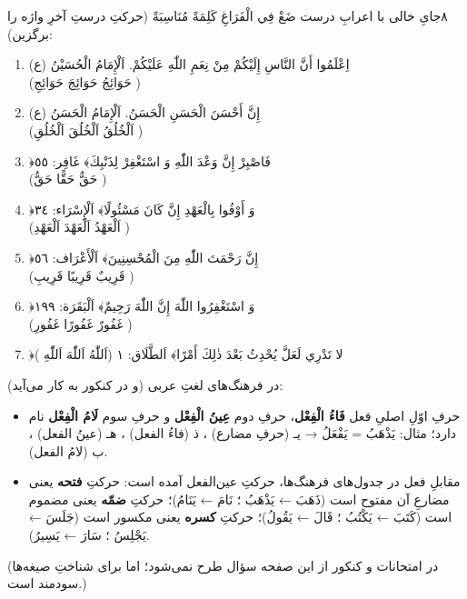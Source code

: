 \begin{JTamrin}{٨}{جایِ خالی با اعرابِ درست}
ضَعْ فِي الْفَرَاغِ كَلِمَةً مُنَاسِبَةً (حرکتِ درستِ آخرِ واژه را برگزین):

\begin{enumerate}
  \item اِعْلَمُوا أَنَّ \JdotsW{2.2cm} النَّاسِ إِلَيْكُمْ مِنْ نِعَمِ اللّٰهِ
        عَلَيْكُمْ. اَلْإِمَامُ الْحُسَيْنُ (ع)\\
        (حَوَائِجُ \JTick\quad حَوَائِجَ \JTick\quad حَوَائِجِ \JTick)
  \item إِنَّ أَحْسَنَ الْحَسَنِ \JdotsW{2.2cm} الْحَسَنُ. اَلْإِمَامُ الْحَسَنُ
        (ع)\\
        (اَلْخُلُقُ \JTick\quad اَلْخُلُقَ \JTick\quad اَلْخُلُقِ \JTick)
  \item ﴿فَاصْبِرْ إِنَّ وَعْدَ اللّٰهِ \JdotsW{2.2cm} وَ اسْتَغْفِرْ
        لِذَنْبِكَ﴾ غَافِر: ٥٥\\
        (حَقٌّ \JTick\quad حَقًّا \JTick\quad حَقُّ \JTick)
  \item ﴿وَ أَوْفُوا بِالْعَهْدِ إِنَّ \JdotsW{2.2cm} كَانَ مَسْئُولًا﴾
        اَلْإِسْرَاء: ٣٤\\
        (اَلْعَهْدُ \JTick\quad اَلْعَهْدَ \JTick\quad اَلْعَهْدِ \JTick)
  \item ﴿إِنَّ رَحْمَتَ اللّٰهِ \JdotsW{2.2cm} مِنَ الْمُحْسِنِينَ﴾
        اَلْأَعْرَاف: ٥٦\\
        (قَرِيبٌ \JTick\quad قَرِيبًا \JTick\quad قَرِيبِ \JTick)
  \item ﴿وَ اسْتَغْفِرُوا اللّٰهَ إِنَّ اللّٰهَ \JdotsW{2.2cm} رَحِيمٌ﴾
        اَلْبَقَرَة: ١٩٩\\
        (غَفُورٌ \JTick\quad غَفُورًا \JTick\quad غَفُورِ \JTick)
  \item ﴿لا تَدْرِي لَعَلَّ \JdotsW{2.2cm} يُحْدِثُ بَعْدَ ذٰلِكَ أَمْرًا﴾
        اَلطَّلَاق: ١ 
        (اَللّٰهُ \JTick\quad اَللّٰهَ \JTick\quad اَللّٰهِ \JTick)
\end{enumerate}
\end{JTamrin}

\begin{JGood}
در فرهنگ‌های لغتِ عربی (و در کنکور به کار می‌آید):
\begin{itemize}
  \item حرفِ اوّلِ اصلیِ فعل \textbf{فَاءُ الْفِعْل}، حرفِ دوم \textbf{عِينُ
        الْفِعْل} و حرفِ سوم \textbf{لَامُ الْفِعْل} نام دارد؛ مثال:
        يَذْهَبُ = يَفْعَلُ → يـ (حرفِ مضارع) ، ذ (فاءُ الفعل) ، هـ (عينُ
        الفعل) ، ب (لامُ الفعل).
  \item مقابلِ فعل در جدول‌های فرهنگ‌ها، حرکتِ عین‌الفعل آمده است: حرکتِ
        \textbf{فتحه} یعنی مضارعِ آن مفتوح است (ذَهَبَ ← يَذْهَبُ ؛ نَامَ ←
        يَنَامُ)؛ حرکتِ \textbf{ضمّه} یعنی مضموم است (كَتَبَ ← يَكْتُبُ ؛
        قَالَ ← يَقُولُ)؛ حرکتِ \textbf{کسره} یعنی مکسور است (جَلَسَ ←
        يَجْلِسُ ؛ سَارَ ← يَسِيرُ).
\end{itemize}
(در امتحانات و کنکور از این صفحه سؤال طرح نمی‌شود؛ اما برای شناختِ صیغه‌ها
سودمند است.)
\end{JGood}

